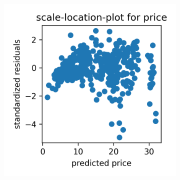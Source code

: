 \documentclass[12 pt]{scrartcl}
\begin{document}
\begin{figure}[htb]
\begin{subfigure}[b]{0.32\textwidth}
    \label{fig:qqplotyyhatprice}
  \end{subfigure}
  \begin{subfigure}[b]{0.32\textwidth}
    \centering
    \includegraphics[width=\textwidth]{./images/scalelocationplot_price.png}
    \label{fig:scalelocationplotprice}
  \end{subfigure}


\end{figure}
\end{document}
